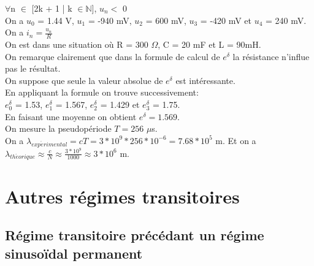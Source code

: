 \documentclass{scrartcl}
\begin{document}
					$\forall$n $\in$ [2k + 1 | k $\in \mathbb{N}$], $u_n <$ 0\\
					On a $u_0$ = 1.44 V, $u_1$ = -940 mV, $u_2$ = 600 mV, $u_3$ = -420 mV et $u_4$ = 240 mV.\\
					On a $i_n = \frac{u_n}{R}$\\
					On est dans une situation où R = 300 $\Omega$, C = 20 mF et L = 90mH.\\
					On remarque clairement que dans la formule de calcul de $e^{\delta}$ la résistance n'influe pas le résultat.\\
					On suppose que seule la valeur absolue de $e^{\delta}$ est intéressante.\\
					En appliquant la formule on trouve successivement:\\
					$e_0^{\delta}$ = 1.53, $e_1^{\delta}$ = 1.567, $e_2^{\delta}$ = 1.429 et $e_3^{\delta}$ = 1.75.\\
					En faisant une moyenne on obtient $e^{\delta} = 1.569$.\\
					On mesure la pseudopériode $T = 256$ $\mu$s.\\ %
					On a $\lambda_{exp\acute erimental} = cT = 3 * 10^9 * 256 * 10^{-6} = 7.68 * 10^{5}$ m.
					Et on a $\lambda_{th\acute eorique} \approx \frac{c}{N} \approx \frac{3 * 10^9}{1000} \approx 3 * 10^6$ m. %
			
			\section{Autres régimes transitoires}
			
				
				\setcounter{subsection}{1}
				\subsection{Régime transitoire précédant un régime sinusoïdal permanent}
			
			
\end{document}
